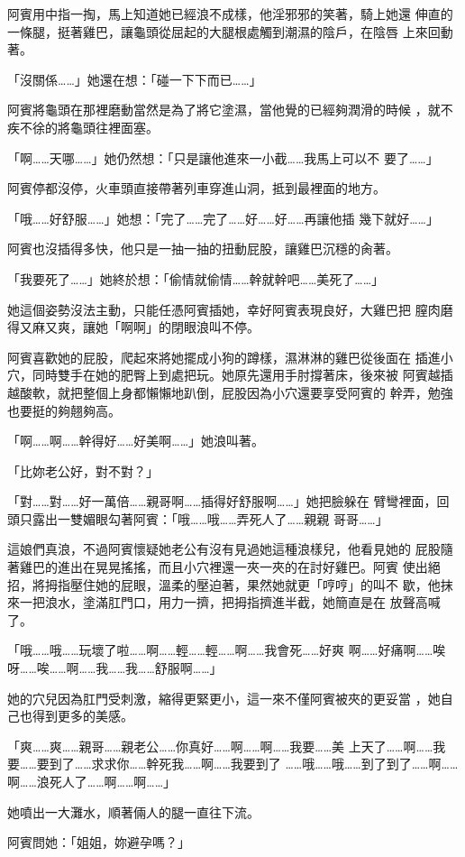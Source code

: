 阿賓用中指一掏，馬上知道她已經浪不成樣，他淫邪邪的笑著，騎上她還
伸直的一條腿，挺著雞巴，讓龜頭從屈起的大腿根處觸到潮濕的陰戶，在陰唇
上來回動著。

「沒關係……」她還在想：「碰一下下而已……」

阿賓將龜頭在那裡磨動當然是為了將它塗濕，當他覺的已經夠潤滑的時候
，就不疾不徐的將龜頭往裡面塞。

「啊……天哪……」她仍然想：「只是讓他進來一小截……我馬上可以不
要了……」

阿賓停都沒停，火車頭直接帶著列車穿進山洞，抵到最裡面的地方。

「哦……好舒服……」她想：「完了……完了……好……好……再讓他插
幾下就好……」

阿賓也沒插得多快，他只是一抽一抽的扭動屁股，讓雞巴沉穩的肏著。

「我要死了……」她終於想：「偷情就偷情……幹就幹吧……美死了……」

她這個姿勢沒法主動，只能任憑阿賓插她，幸好阿賓表現良好，大雞巴把
膣肉磨得又麻又爽，讓她「啊啊」的閉眼浪叫不停。

阿賓喜歡她的屁股，爬起來將她擺成小狗的蹲樣，濕淋淋的雞巴從後面在
插進小穴，同時雙手在她的肥臀上到處把玩。她原先還用手肘撐著床，後來被
阿賓越插越酸軟，就把整個上身都懶懶地趴倒，屁股因為小穴還要享受阿賓的
幹弄，勉強也要挺的夠翹夠高。

「啊……啊……幹得好……好美啊……」她浪叫著。

「比妳老公好，對不對？」

「對……對……好一萬倍……親哥啊……插得好舒服啊……」她把臉躲在
臂彎裡面，回頭只露出一雙媚眼勾著阿賓：「哦……哦……弄死人了……親親
哥哥……」

這娘們真浪，不過阿賓懷疑她老公有沒有見過她這種浪樣兒，他看見她的
屁股隨著雞巴的進出在晃晃搖搖，而且小穴裡還一夾一夾的在討好雞巴。阿賓
使出絕招，將拇指壓住她的屁眼，溫柔的壓迫著，果然她就更「哼哼」的叫不
歇，他抹來一把浪水，塗滿肛門口，用力一擠，把拇指擠進半截，她簡直是在
放聲高喊了。

「哦……哦……玩壞了啦……啊……輕……輕……啊……我會死……好爽
啊……好痛啊……唉呀……唉……啊……我……我……舒服啊……」

她的穴兒因為肛門受刺激，縮得更緊更小，這一來不僅阿賓被夾的更妥當
，她自己也得到更多的美感。

「爽……爽……親哥……親老公……你真好……啊……啊……我要……美
上天了……啊……我要……要到了……求求你……幹死我……啊……我要到了
……哦……哦……到了到了……啊……啊……浪死人了……啊……啊……」

她噴出一大灘水，順著倆人的腿一直往下流。

阿賓問她：「姐姐，妳避孕嗎？」

